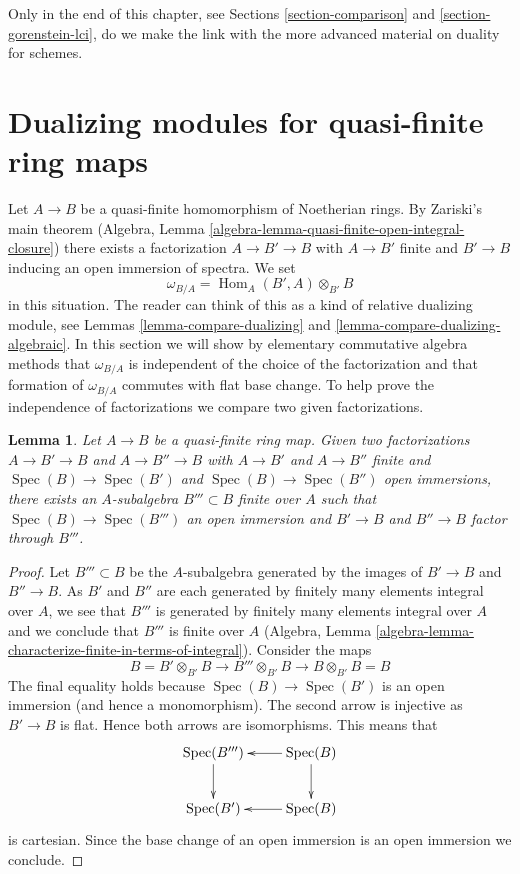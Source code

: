 \documentclass{stacks-project}
\theoremstyle{plain}
\newtheorem{lemma}[subsection]{Lemma}
\theoremstyle{definition}
\theoremstyle{remark}
\numberwithin{equation}{subsection}
\def\Spec{\mathop{\mathrm{Spec}}}
\def\Hom{\mathop{\mathrm{Hom}}\nolimits}
\begin{document}
\medskip\noindent
Only in the end of this chapter, see
Sections \ref{section-comparison} and \ref{section-gorenstein-lci},
do we make the link with the more advanced material
on duality for schemes.








\section{Dualizing modules for quasi-finite ring maps}
\label{section-quasi-finite-dualizing}

\noindent
Let $A \to B$ be a quasi-finite homomorphism of Noetherian rings. By
Zariski's main theorem
(Algebra, Lemma \ref{algebra-lemma-quasi-finite-open-integral-closure})
there exists a factorization $A \to B' \to B$ with
$A \to B'$ finite and $B' \to B$ inducing an open immersion of spectra.
We set
\begin{equation}
\label{equation-dualizing}
\omega_{B/A} = \Hom_A(B', A) \otimes_{B'} B
\end{equation}
in this situation. The reader can think of this as a kind of relative
dualizing module, see Lemmas \ref{lemma-compare-dualizing} and
\ref{lemma-compare-dualizing-algebraic}.
In this section we will show by elementary commutative algebra methods
that $\omega_{B/A}$ is independent of the choice of the factorization
and that formation of $\omega_{B/A}$ commutes with flat base change.
To help prove the independence of factorizations we compare two
given factorizations.

\begin{lemma}
\label{lemma-dominate-factorizations}
Let $A \to B$ be a quasi-finite ring map. Given two factorizations
$A \to B' \to B$ and $A \to B'' \to B$ with
$A \to B'$ and $A \to B''$ finite and $\Spec(B) \to \Spec(B')$
and $\Spec(B) \to \Spec(B'')$ open immersions, there exists
an $A$-subalgebra $B''' \subset B$ finite over $A$ such that
$\Spec(B) \to \Spec(B''')$ an open immersion and $B' \to B$ and
$B'' \to B$ factor through $B'''$.
\end{lemma}

\begin{proof}
Let $B''' \subset B$ be the $A$-subalgebra generated by the images
of $B' \to B$ and $B'' \to B$. As $B'$ and $B''$ are each generated
by finitely many elements integral over $A$, we see that $B'''$ is
generated by finitely many elements integral over $A$ and we conclude
that $B'''$ is finite over $A$
(Algebra, Lemma \ref{algebra-lemma-characterize-finite-in-terms-of-integral}).
Consider the maps
$$
B = B' \otimes_{B'} B \to B''' \otimes_{B'} B \to B \otimes_{B'} B = B
$$
The final equality holds because $\Spec(B) \to \Spec(B')$ is an
open immersion (and hence a monomorphism). The second arrow is injective
as $B' \to B$ is flat. Hence both arrows are isomorphisms.
This means that
$$
\xymatrix{
\Spec(B''') \ar[d] & \Spec(B) \ar[d] \ar[l] \\
\Spec(B') & \Spec(B) \ar[l]
}
$$
is cartesian. Since the base change of an open immersion is an
open immersion we conclude.
\end{proof}
\end{document}
